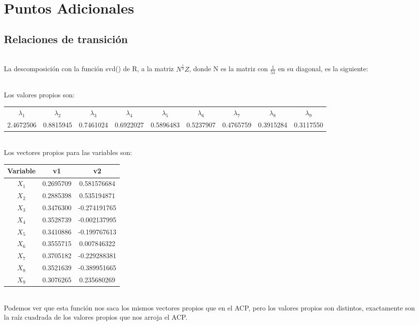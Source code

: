 \documentclass[report,oneside]{revcoles}
\begin{document}
\section{Puntos Adicionales}
\subsection{Relaciones de transición}
~\\La descomposición con la función svd() de R, a la matriz $N^{\frac{1}{2}}Z$, donde N es la matriz con $\frac{1}{51}$ en su diagonal, es la siguiente:

~\\Los valores propios son:
\begin{center}
\resizebox{17cm}{!} {
\begin{tabular}{|ccccccccc|}
\hline 
$\lambda_1$ & $\lambda_2$ & $\lambda_3$ & $\lambda_4$ & $\lambda_5$ & $\lambda_6$ & $\lambda_7$ & $\lambda_8$ & $\lambda_9$ \\ 
2.4672506 & 0.8815945 & 0.7461024 & 0.6922027 & 0.5896483 & 0.5237907 & 0.4765759 & 0.3915284 & 0.3117550 \\ 
\hline 
\end{tabular} 
}
\end{center}

~\\Los vectores propios para las variables son:
\begin{center}
\begin{tabular}{|c|c|c|}
\hline 
Variable & v1 & v2 \\ 
\hline 
$X_1$ & 0.2695709 & 0.581576684 \\ 
$X_2$ & 0.2885398 & 0.535194871 \\  
$X_3$ & 0.3476300 & -0.274191765 \\  
$X_4$ & 0.3528739 & -0.002137995 \\  
$X_5$ & 0.3410886 & -0.199767613 \\  
$X_6$ & 0.3555715 & 0.007846322 \\ 
$X_7$ & 0.3705182 & -0.229288381 \\  
$X_8$ & 0.3521639 & -0.389951665 \\  
$X_9$ & 0.3076265 & 0.235680269 \\ 
\hline 
\end{tabular} 
\end{center}

~\\Podemos ver que esta función nos saca los mismos vectores propios que en el ACP, pero los valores propios son distintos, exactamente son la raíz cuadrada de los valores propios que nos arroja el ACP.
\end{document}
